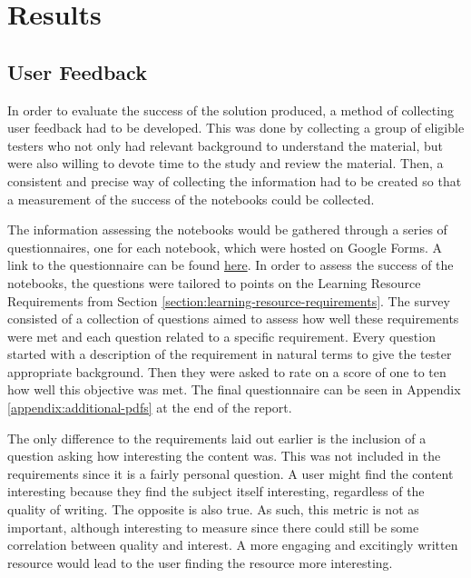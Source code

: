 \chapter{Results}
\label{chapter3}


\section{User Feedback} \label{section:user-feedback}

In order to evaluate the success of the solution produced, a method of collecting user feedback had to be developed. This was done by collecting a group of eligible testers who not only had relevant background to understand the material, but were also willing to devote time to the study and review the material. Then, a consistent and precise way of collecting the information had to be created so that a measurement of the success of the notebooks could be collected.

The information assessing the notebooks would be gathered through a series of questionnaires, one for each notebook, which were hosted on Google Forms. A link to the questionnaire can be found \href{https://docs.google.com/forms/d/175MU_wRfSiDJ0iOZruNCj8xvd4Ud7c0Js2M29bnK1PA/edit}{here}. In order to assess the success of the notebooks, the questions were tailored to points on the Learning Resource Requirements from Section \ref{section:learning-resource-requirements}. The survey consisted of a collection of questions aimed to assess how well these requirements were met and each question related to a specific requirement. Every question started with a description of the requirement in natural terms to give the tester appropriate background. Then they were asked to rate on a score of one to ten how well this objective was met. The final questionnaire can be seen in Appendix \ref{appendix:additional-pdfs} at the end of the report.

The only difference to the requirements laid out earlier is the inclusion of a question asking how interesting the content was. This was not included in the requirements since it is a fairly personal question. A user might find the content interesting because they find the subject itself interesting, regardless of the quality of writing. The opposite is also true. As such, this metric is not as important, although interesting to measure since there could still be some correlation between quality and interest. A more engaging and excitingly written resource would lead to the user finding the resource more interesting.

